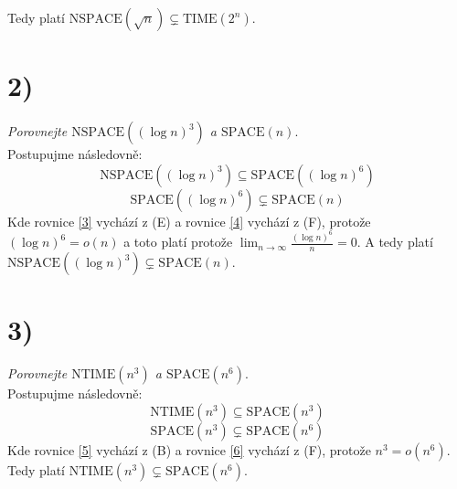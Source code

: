 \documentclass{article}
\newcommand{\TIME}[1]{\mathrm{TIME}(#1)}
\newcommand{\NTIME}[1]{\mathrm{NTIME}(#1)}
\newcommand{\SPACE}[1]{\mathrm{SPACE}(#1)}
\newcommand{\NSPACE}[1]{\mathrm{NSPACE}(#1)}
\begin{document}
Tedy platí $\NSPACE{\sqrt{n}} \subsetneq \TIME{2^n}$.


\section*{2)}
\emph{Porovnejte $\NSPACE{(\log n)^3}$ a $\SPACE{n}$}.\\

Postupujme následovně:
\begin{equation} \label{3}
  \NSPACE{(\log n)^3} \subseteq \SPACE{(\log n)^6}
\end{equation}
\begin{equation} \label{4}
  \SPACE{(\log n)^6} \subsetneq \SPACE{n}
\end{equation}
Kde rovnice \ref{3} vychází z (E) a rovnice \ref{4} vychází z (F), protože
$(\log n)^6 = o(n)$ a toto platí protože
$\lim_{n \rightarrow \infty} \frac{(\log n)^6}{n} = 0$.
A tedy platí $\NSPACE{(\log n)^3} \subsetneq \SPACE{n}$.


\section*{3)}
\emph{Porovnejte $\NTIME{n^3}$ a $\SPACE{n^6}$}.\\

Postupujme následovně:
\begin{equation} \label{5}
  \NTIME{n^3} \subseteq \SPACE{n^3}
\end{equation}
\begin{equation} \label{6}
  \SPACE{n^3} \subsetneq \SPACE{n^6}
\end{equation}
Kde rovnice \ref{5} vychází z (B) a rovnice \ref{6} vychází z (F), protože
$n^3 = o(n^6)$. Tedy platí $\NTIME{n^3} \subsetneq \SPACE{n^6}$.
\end{document}
